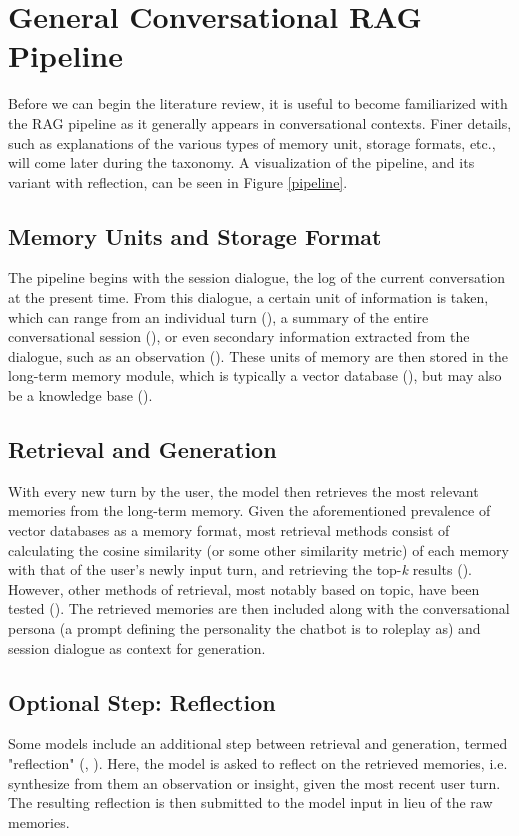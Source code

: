 \section{General Conversational RAG Pipeline}

Before we can begin the literature review, it is useful to become familiarized with the RAG pipeline as it generally appears in conversational contexts. Finer details, such as explanations of the various types of memory unit, storage formats, etc., will come later during the taxonomy. A visualization of the pipeline, and its variant with reflection, can be seen in Figure \ref{pipeline}.

\subsection{Memory Units and Storage Format} 
	
The pipeline begins with the session dialogue, the log of the current conversation at the present time. From this dialogue, a certain unit of information is taken, which can range from an individual turn (\cite{Park2023}), a summary of the entire conversational session (\cite{Li2024}), or even secondary information extracted from the dialogue, such as an observation (\cite{Maharana2024}). These units of memory are then stored in the long-term memory module, which is typically a vector database (\cite{Hatalis2024}), but may also be a knowledge base (\cite{Sanmartin2024}). 

\subsection{Retrieval and Generation}

With every new turn by the user, the model then retrieves the most relevant memories from the long-term memory. Given the aforementioned prevalence of vector databases as a memory format, most retrieval methods consist of calculating the cosine similarity (or some other similarity metric) of each memory with that of the user's newly input turn, and retrieving the top-\textit{k} results (\cite{Hatalis2024}). However, other methods of retrieval, most notably based on topic, have been tested (\cite{Li2024}). The retrieved memories are then included along with the conversational persona (a prompt defining the personality the chatbot is to roleplay as) and session dialogue as context for generation. 

\subsection{Optional Step: Reflection}

Some models include an additional step between retrieval and generation, termed "reflection" (\cite{Maharana2024}, \cite{Park2023}). Here, the model is asked to reflect on the retrieved memories, i.e. synthesize from them an observation or insight, given the most recent user turn. The resulting reflection is then submitted to the model input in lieu of the raw memories.
